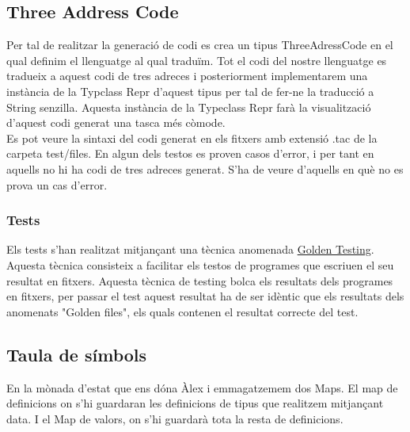 \documentclass{article}
\begin{document}
\subsection{Three Address Code}
Per tal de realitzar la generació de codi es crea un tipus ThreeAdressCode en el qual definim el llenguatge al qual traduïm. Tot el codi del nostre llenguatge es tradueix a aquest codi de tres adreces i posteriorment implementarem una instància de la Typclass Repr d'aquest tipus per tal de fer-ne la traducció a String senzilla. Aquesta instància de la Typeclass Repr farà la visualització d'aquest codi generat una tasca més còmode.\\
Es pot veure la sintaxi del codi generat en els fitxers amb extensió .tac de la carpeta test/files. En algun dels testos es proven casos d'error, i per tant en aquells no hi ha codi de tres adreces generat. S'ha de veure d'aquells en què no es prova un cas d'error.
\subsubsection{Tests}
Els tests s'han realitzat mitjançant una tècnica anomenada \href{https://hackage.haskell.org/package/tasty-golden}{Golden Testing}. Aquesta tècnica consisteix a facilitar els testos de programes que escriuen el seu resultat en fitxers. Aquesta tècnica de testing bolca els resultats dels programes en fitxers, per passar el test aquest resultat ha de ser idèntic que els resultats dels anomenats "Golden files", els quals contenen el resultat correcte del test.
\subsection{Taula de símbols}
En la mònada d'estat que ens dóna Àlex i emmagatzemem dos Maps. El map
de definicions on s'hi guardaran les definicions de tipus que realitzem
mitjançant data. I el Map de valors, on s'hi guardarà tota la resta de
definicions.
\end{document}
